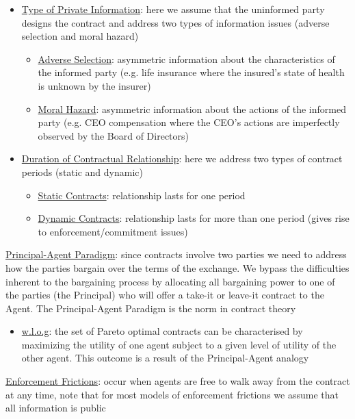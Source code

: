 \documentclass{article}
\begin{document}
\begin{itemize}
    \item \underline{Type of Private Information}: here we assume that the uninformed party designs the contract and address two types of information issues (adverse selection and moral hazard)
    \begin{itemize}
        \item  \underline{Adverse Selection}: asymmetric information about the characteristics of the informed party (e.g. life insurance where the insured's state of health is unknown by the insurer)
        \item  \underline{Moral Hazard}: asymmetric information about the actions of the informed party (e.g. CEO compensation where the CEO's actions are imperfectly observed by the Board of Directors)
    \end{itemize}
    \item  \underline{Duration of Contractual Relationship}: here we address two types of contract periods (static and dynamic)
    \begin{itemize}
        \item  \underline{Static Contracts}: relationship lasts for one period
        \item  \underline{Dynamic Contracts}: relationship lasts for more than one period (gives rise to enforcement/commitment issues)
    \end{itemize}
\end{itemize}
\vspace{2.5mm}
\par \underline{Principal-Agent Paradigm}: since contracts involve two parties we need to address how the parties bargain over  the terms of the exchange. We bypass the difficulties inherent to the bargaining process by allocating all bargaining power to one of the parties (the Principal) who will offer a take-it or leave-it contract to the Agent. The Principal-Agent Paradigm is the norm in contract theory
\begin{itemize}
    \item \underline{w.l.o.g}: the set of Pareto optimal contracts can be characterised by maximizing the utility of one agent subject to a given level of utility of the other agent. This outcome is a result of the Principal-Agent analogy
\end{itemize}
\vspace{2.5mm}
\par \underline{Enforcement Frictions}: occur when agents are free to walk away from the contract at any time, note that for most models of enforcement frictions we assume that all information is public
\end{document}
